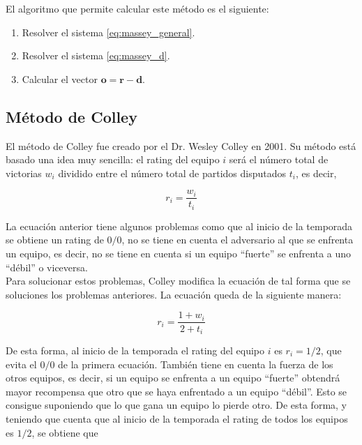 \begin{longtable}{c c p{5cm} p{6cm}}
\bottomrule
\end{longtable}

El algoritmo que permite calcular este método es el siguiente:

\begin{enumerate}
\item Resolver el sistema \ref{eq:massey_general}.
\item Resolver el sistema \ref{eq:massey_d}.
\item Calcular el vector $\mathbf{o} = \mathbf{r} - \mathbf{d}$.
\end{enumerate}

\subsection{Método de Colley}

El método de Colley fue creado por el Dr. Wesley Colley en 2001. Su método está basado una idea muy sencilla: el rating del equipo $i$ será el número total de victorias $w_i$ dividido entre el número total de partidos disputados $t_i$, es decir, 

\begin{equation}
r_i = \dfrac{w_i}{t_i}
\end{equation}

La ecuación anterior tiene algunos problemas como que al inicio de la temporada se obtiene un rating de $0/0$, no se tiene en cuenta el adversario al que se enfrenta un equipo, es decir, no se tiene en cuenta si un equipo ``fuerte'' se enfrenta a uno ``débil'' o viceversa. \\
Para solucionar estos problemas, Colley modifica la ecuación de tal forma que se soluciones los problemas anteriores. La ecuación queda de la siguiente manera:

\begin{equation}
r_i = \dfrac{1 + w_i}{2 + t_i} \label{eq:colley}
\end{equation}

De esta forma, al inicio de la temporada el rating del equipo $i$ es $r_i = 1/2$, que evita el $0/0$ de la primera ecuación. También tiene en cuenta la fuerza de los otros equipos, es decir, si un equipo se enfrenta a un equipo ``fuerte'' obtendrá mayor recompensa que otro que se haya enfrentado a un equipo ``débil''. Esto se consigue suponiendo que lo que gana un equipo lo pierde otro. De esta forma, y teniendo que cuenta que al inicio de la temporada el rating de todos los equipos es $1/2$, se obtiene que

